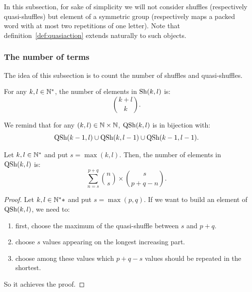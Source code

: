 In this subsection, for sake of simplicity we will not consider shuffles (respectively quasi-shuffles) but element of a symmetric group (respectively maps a packed word with at most two repetitions of one letter). 
Note that definition~\ref{def:quasiaction} extends naturally to such objects.

\subsubsection{The number of terms}

The idea of this subsection is to count the number of shuffles and quasi-shuffles. 
\begin{Lemme}
	For any $k,l\in\mathbb{N}^*$, the number of elements in $\operatorname{Sh}(k,l)$ is:
	\[
	\binom{k+l}{k}.
	\]
\end{Lemme}
We remind that for any $(k,l)\in\mathbb{N} \times \mathbb{N}$, $\operatorname{QSh}(k,l)$ is in bijection with:
\[
\operatorname{QSh}(k-1,l)\cup \operatorname{QSh}(k,l-1) \cup \operatorname{QSh}(k-1,l-1).
\]
\begin{Prop}
	Let $k,l\in\mathbb{N}^*$ and put $s=\max(k,l)$. Then, the number of elements in $\operatorname{QSh}(k,l)$ is:
	\[
	\sum_{n=s}^{p+q} \binom{n}{s}\times \binom{s}{p+q-n}.
	\]
\end{Prop}
\begin{proof}
	Let $k,l\in\mathbb{N}^**$ and put $s=\max(p,q)$. If we want to build an element of $\operatorname{QSh}(k,l)$, we need to:
	\begin{enumerate}
		\item first, choose the maximum of the quasi-shuffle between $s$ and $p+q$.
		\item choose $s$ values appearing on the longest increasing part.
		\item choose among these values which $p+q-s$ values should be repeated in the shortest.
	\end{enumerate}
	So it achieves the proof.
\end{proof}

